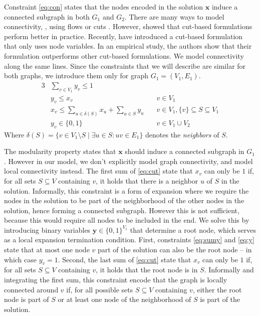 		Constraint \eqref{eq:con} states that the nodes encoded in the solution $\mathbf{x}$ induce a connected subgraph in both $G_1$ and $G_2$.
		There are many ways to model connectivity, \eg, using flows or cuts
		\parencite{magnanti1995optimal}.
		However, \textcite{dilkina2010solving} showed that cut-based formulations perform better in practice.
		Recently, \textcite{alvarez2013maximum} have introduced a cut-based formulation that only uses node variables.
		In an empirical study, the authors show that their formulation outperforms other cut-based formulations.
		We model connectivity along the same lines.
		Since the constraints that we will describe are similar for both graphs, we introduce them only for graph $G_1 = (V_1, E_1)$.
		\allowdisplaybreaks
		\begin{alignat}{3}
		\label{eq:sumy} & \sum_{v \in V_1} y_v \leq 1 & \\
		\label{eq:y}    & y_v \leq x_v & v \in V_1\\
		\label{eq:cut}  & x_v \leq \sum_{u \in \delta(S)} x_u + \sum_{u \in S} y_u
                  		\quad & v \in V_1, \{v\} \subseteq S \subseteq{V_1}\\
		\label{eq:vars3} & y_v \in \{0,1\} & v \in V_1 \cup V_2
		\end{alignat}
		Where $\delta(S) = \{ v \in V_1 \setminus S \mid \exists u \in S: uv \in E_1 \}$ denotes the \emph{neighbors} of $S$.

		The modularity property states that $\mathbf{x}$ should induce a connected subgraph in $G_1$.
		However in our model, we don't explicitly model graph connectivity, and model local connectivity instead.
		The first sum of \eqref{eq:cut} state that $x_v$ can only be $1$ if, for all sets $S \subseteq V$ containing $v$, it holds that there is a neighbor $u$ of $S$ in the solution.
		Informally, this constraint is a form of expansion where we require the nodes in the solution to be part of the neighborhood of the other nodes in the solution, hence forming a connected subgraph.
		However this is not sufficient, because this would require all nodes to be included in the end.
		We solve this by introducing binary variables $\mathbf{y} \in \{0, 1\}^{V_1}$ that determine a root node, which serves as a local expansion termination condition.
		First, constraints \eqref{eq:sumy} and \eqref{eq:y} state that at most one node $v$ part of the solution can also be the root node -- in which case $y_v = 1$.
		Second, the last sum of \eqref{eq:cut} state that $x_v$ can only be $1$ if, for all sets $S
		\subseteq V$ containing $v$, it holds that the root node is in $S$.
		Informally and integrating the first sum, this constraint encode that the graph is locally connected around $v$ if, for all possible sets $S \subseteq V$ containing $v$, either the root node is part of $S$ or at least one node of the neighborhood of $S$ is part of the solution.

